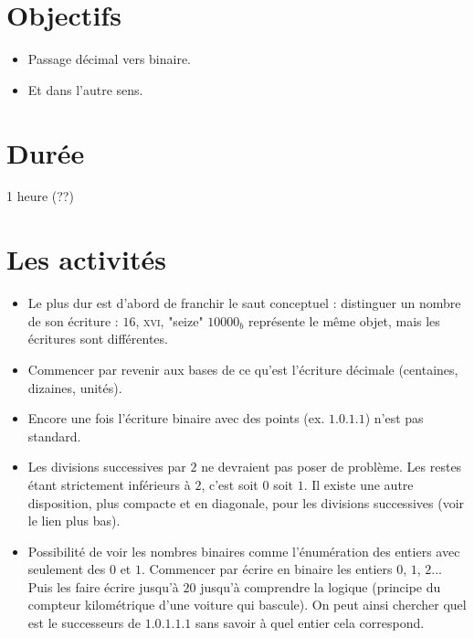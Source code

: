 \documentclass[class=report,crop=false, 12pt]{standalone}
\begin{document}



\section*{Objectifs}

\begin{itemize}
  \item Passage décimal vers binaire.
  \item Et dans l'autre sens.
\end{itemize}


\section*{Durée}

1 heure (??)

\section*{Les activités}

\begin{itemize}
  \item Le plus dur est d'abord de franchir le saut conceptuel : distinguer un nombre de son écriture : $16$, \textsc{xvi}, "seize" $10000_b$ représente le même objet, mais les écritures sont différentes.
  
  \item Commencer par revenir aux bases  de ce qu'est l'écriture décimale (centaines, dizaines, unités).
  
  \item Encore une fois l'écriture binaire avec des points (ex. $1.0.1.1$) n'est pas standard.
  
  \item Les divisions successives par $2$ ne devraient pas poser de problème. Les restes étant strictement inférieurs à $2$, c'est soit $0$ soit $1$. Il existe une autre disposition, plus compacte et en diagonale, pour les divisions successives (voir le lien plus bas).
  
  \item Possibilité de voir les nombres binaires comme l'énumération des entiers avec seulement des $0$ et $1$. Commencer par écrire en binaire les entiers $0$, $1$, $2$...
  Puis les faire écrire jusqu'à $20$ jusqu'à comprendre la logique (principe du compteur kilométrique d'une voiture qui bascule). On  peut ainsi chercher quel est le successeurs de $1.0.1.1.1$ sans savoir à quel entier cela correspond.
\end{itemize}
\end{document}
